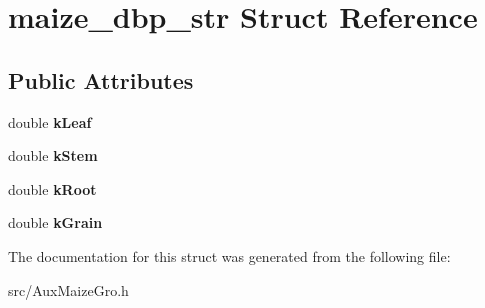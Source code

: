 \hypertarget{structmaize__dbp__str}{\section{maize\-\_\-dbp\-\_\-str Struct Reference}
\label{structmaize__dbp__str}
}
\subsection*{Public Attributes}
\begin{DoxyCompactItemize}
\item 
\hypertarget{structmaize__dbp__str_a3062ec04f179220bf20930132d37d7bb}{double {\bfseries k\-Leaf}}\label{structmaize__dbp__str_a3062ec04f179220bf20930132d37d7bb}

\item 
\hypertarget{structmaize__dbp__str_a57ebb4d5838c2616743e1859d89cee17}{double {\bfseries k\-Stem}}\label{structmaize__dbp__str_a57ebb4d5838c2616743e1859d89cee17}

\item 
\hypertarget{structmaize__dbp__str_a728cf2873da3f8feff0baf22712865b0}{double {\bfseries k\-Root}}\label{structmaize__dbp__str_a728cf2873da3f8feff0baf22712865b0}

\item 
\hypertarget{structmaize__dbp__str_acbe33a19c2478eeccd3db39aee1103ee}{double {\bfseries k\-Grain}}\label{structmaize__dbp__str_acbe33a19c2478eeccd3db39aee1103ee}

\end{DoxyCompactItemize}


The documentation for this struct was generated from the following file\-:\begin{DoxyCompactItemize}
\item 
src/Aux\-Maize\-Gro.\-h\end{DoxyCompactItemize}
